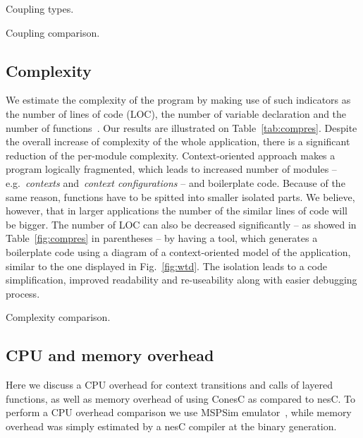 \begin{table}[!h]
\renewcommand{\arraystretch}{1.3}
\caption{Coupling types.}
\label{tab:couptypes}

\end{table}

\begin{table}[!h]
\renewcommand{\arraystretch}{1.3}
\caption{Coupling comparison.}
\label{tab:coupres}

\end{table}

\subsection{Complexity} 

We estimate the complexity of the program by making use of such indicators as the number of
lines of code (LOC), the number of variable declaration and the number of
functions~\cite{pressman01}. Our results are illustrated on
Table~\ref{tab:compres}. Despite the overall increase of complexity of the whole
application, there is a significant reduction of the per-module complexity.
Context-oriented approach makes a program logically
fragmented, which leads to increased number of modules -- e.g.~\emph{contexts}
and~\emph{context configurations} -- and boilerplate code. Because of the same
reason, functions have to be spitted into smaller isolated parts. We believe, however,
that in larger applications the number of the similar lines of code will be bigger.
The number of LOC can also be decreased significantly -- as showed in Table~\ref{fig:compres} in
parentheses -- by having a tool, which generates a boilerplate code using a diagram of a
context-oriented model of the application, similar to the one displayed in Fig.~\ref{fig:wtd}.
The isolation leads to a code simplification, improved
readability and re-useability along with easier debugging process.

\begin{table}[!h]
\renewcommand{\arraystretch}{1.3}
\caption{Complexity comparison.}
\label{tab:compres}

\end{table}

\subsection{CPU and memory overhead}

Here we discuss a CPU overhead for context transitions and calls of layered
functions, as well as memory overhead of using ConesC as compared to nesC. To perform a CPU
overhead comparison we use MSPSim emulator~\cite{eriksson09}, while memory overhead was
simply estimated by a nesC compiler at the binary generation.

